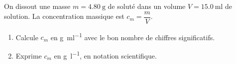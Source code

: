 \documentclass[11pt,a4paper]{article}
\newcommand{\CS}{chiffres significatifs}
\begin{document}
\begin{exo}
On dissout une masse $m = \qty{4,80}{\gram}$ de soluté dans un volume $V = \qty{15,0}{\milli\litre}$
de solution. La concentration massique est $c_m = \dfrac{m}{V}$.
\begin{enumerate}[label=\alph*),leftmargin=1.6em,itemsep=1pt]
  \item Calcule $c_m$ en \si{\gram\per\milli\litre} avec le bon nombre de \CS.
  \item Exprime $c_m$ en \si{\gram\per\litre}, en notation scientifique.
\end{enumerate}
\end{exo}
\end{document}

